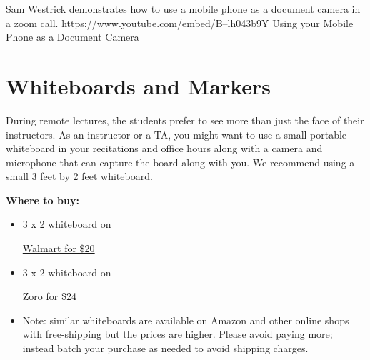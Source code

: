 \begin{gram}
\label{grm:tas::mobile-cam-as-doccam}
Sam Westrick demonstrates how to use a mobile phone as a document camera in a zoom call. 
%
\video
{https://www.youtube.com/embed/B--lh043b9Y}
{Using your Mobile Phone as a Document Camera}
\end{gram}

\section{Whiteboards and Markers}

\begin{gram}[Whiteboards]

During remote lectures, the students prefer to see more than just the
face of their instructors.
%
As an instructor or a TA, you might want to use a small portable
whiteboard in your recitations and office hours along with a camera
and microphone that can capture the board along with you. 
%
We recommend using a small 3 feet by 2 feet whiteboard.  
%

\textbf{Where to buy:}

\begin{itemize}
\item
3 x 2 whiteboard on

\href{https://www.walmart.com/ip/Universal-Melamine-Dry-Erase-Board-36-x-24-Satin-Finished-Aluminum-Frame/21794195?wmlspartner=wlpa&selectedSellerId=1194&&adid=22222222227015737388&wl0=&wl1=g&wl2=c&wl3=52438033391&wl4=pla-83993817911&wl5=1025202&wl6=&wl7=&wl8=&wl9=pla&wl10=112550058&wl11=online&wl12=21794195&veh=sem&gclid=Cj0KCQjwhIP6BRCMARIsALu9Lfmsq_QIRmgF0rbJxUlILrtcELAuduVKI6z9GdzLxIafjLXdwYfXkmMaAoogEALw_wcB}
{Walmart for \$20}

\item
3 x 2 whiteboard on

\href{https://www.zoro.com/zoro-select-dry-erase-board-36-w-silver-1nup9/i/G1291367/}{Zoro for \$24}



\item Note: similar whiteboards are available on Amazon and other online shops with free-shipping but the prices are higher.  Please avoid paying more; instead batch your purchase as needed to avoid shipping charges.


\end{itemize}
\end{gram}
